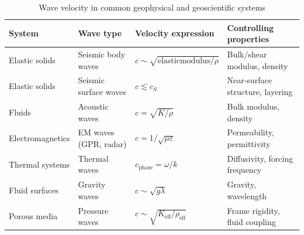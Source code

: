\begin{table}[bth]
    \centering
    \caption{Wave velocity in common geophysical and geoscientific systems}
    \label{tab:wave_velocity}
    \begin{tabularx}{\textwidth}{lXYX}
        \toprule
        \textbf{System} &
        \textbf{Wave type} &
        \textbf{Velocity expression} &
        \textbf{Controlling properties} \\
        \midrule
        Elastic solids
        & Seismic body waves
        & $c \sim \sqrt{\mathrm{elastic modulus}/\rho}$
        & Bulk/shear modulus, density \\

        Elastic solids
        & Seismic surface waves
        & $c \lesssim c_S$
        & Near-surface structure, layering \\

        Fluids
        & Acoustic waves
        & $c = \sqrt{K/\rho}$
        & Bulk modulus, density \\

        Electromagnetics
        & EM waves (GPR, radar)
        & $c = 1/\sqrt{\mu\varepsilon}$
        & Permeability, permittivity \\

        Thermal systems
        & Thermal waves
        & $c_{\mathrm{phase}} = \omega/k$
        & Diffusivity, forcing frequency \\

        Fluid surfaces
        & Gravity waves
        & $c \sim \sqrt{g\lambda}$
        & Gravity, wavelength \\

        Porous media
        & Pressure waves
        & $c \sim \sqrt{K_{\mathrm{eff}}/\rho_{\mathrm{eff}}}$
        & Frame rigidity, fluid coupling \\
        \bottomrule
    \end{tabularx}
\end{table}